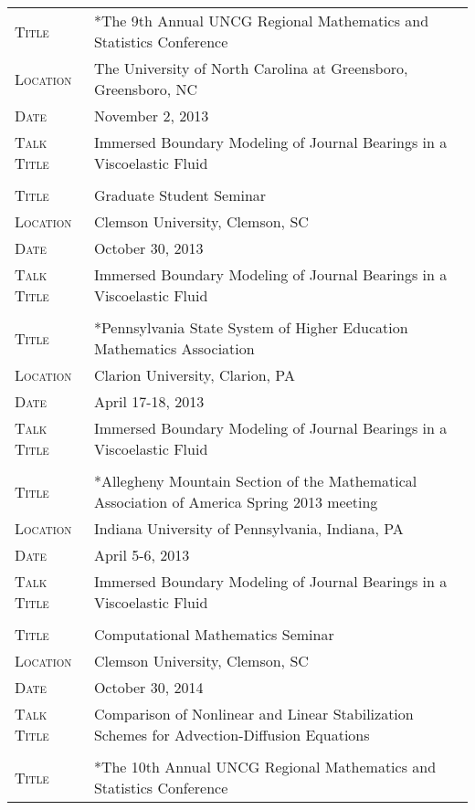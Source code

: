 \documentclass[10pt]{article}
\begin{document}
\begin{tabularx}{0.97\linewidth}{>{\raggedleft\scshape}p{3cm}X}
  Title        & *The 9th Annual UNCG Regional Mathematics and Statistics Conference\\
  Location     & The University of North Carolina at Greensboro, Greensboro, NC\\
  Date         & November 2, 2013 \\
  Talk Title   & Immersed Boundary Modeling of Journal Bearings in a Viscoelastic Fluid \\
               & \\
  Title        & Graduate Student Seminar\\
  Location     & Clemson University, Clemson, SC\\
  Date         & October 30, 2013 \\
  Talk Title   & Immersed Boundary Modeling of Journal Bearings in a Viscoelastic Fluid \\
               & \\
  Title        & *Pennsylvania State System of Higher Education Mathematics Association\\
  Location     & Clarion University, Clarion, PA\\
  Date         & April 17-18, 2013 \\
  Talk Title   & Immersed Boundary Modeling of Journal Bearings in a Viscoelastic Fluid \\
               & \\
  Title        & *Allegheny Mountain Section of the Mathematical Association of America Spring 2013 meeting \\
  Location     & Indiana University of Pennsylvania, Indiana, PA\\
  Date         & April 5-6, 2013 \\
  Talk Title   & Immersed Boundary Modeling of Journal Bearings in a Viscoelastic Fluid \\
               & \\
  Title        & Computational Mathematics Seminar\\
  Location     & Clemson University, Clemson, SC\\
  Date         & October 30, 2014 \\
  Talk Title   & Comparison of Nonlinear and Linear Stabilization Schemes for Advection-Diffusion Equations\\
               & \\
  Title        & *The 10th Annual UNCG Regional Mathematics and Statistics Conference\\

\end{tabularx}
\end{document}
